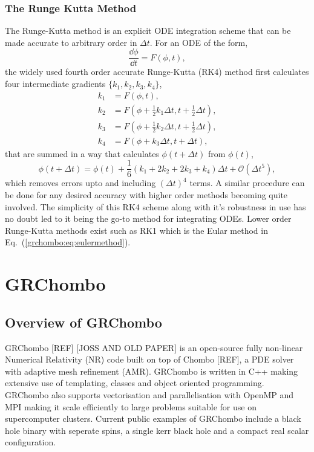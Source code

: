 \subsubsection{The Runge Kutta Method} \label{grchombo:sec:rk4}
The Runge-Kutta method is an explicit ODE integration scheme that can be made accurate to arbitrary order in $\Delta t$. For an ODE of the form,
\begin{equation}
\frac{\dd \phi}{ \dd t} = F(\phi,t),
\end{equation}
the widely used fourth order accurate Runge-Kutta (RK4) method first calculates four intermediate gradients $\{k_1,k_2,k_3,k_4\}$,
\begin{align}
k_1 &=  F(\phi,t) ,\\
k_2 &=  F(\phi + \frac{1}{2}k_1 \Delta t,t+ \frac{1}{2} \Delta t) ,\\
k_3 &=  F(\phi + \frac{1}{2}k_2 \Delta t,t+ \frac{1}{2} \Delta t) ,\\
k_4 &=  F(\phi + k_3 \Delta t,t+  \Delta t) ,
\end{align}
that are summed in a way that calculates $\phi(t+\Delta t)$ from $\phi(t)$,
\begin{equation}
\phi(t+\Delta t) = \phi(t) + \frac{1}{6}\left( k_1 + 2k_2 + 2k_3 + k_4\right)\Delta t + \mathcal{O}(\Delta t^5),
\end{equation}
which removes errors upto and including $(\Delta t)^4$ terms. A similar procedure can be done for any desired accuracy with higher order methods becoming quite involved. The simplicity of this RK4 scheme along with it's robustness in use has no doubt led to it being the go-to method for integrating ODEs. Lower order Runge-Kutta methods exist such as RK1 which is the Eular method in Eq.~(\ref{grchombo:eq:eulermethod}).



\section{GRChombo}
\subsection{Overview of GRChombo}

GRChombo [REF] [JOSS AND OLD PAPER] is an open-source fully non-linear Numerical Relativity (NR) code built on top of Chombo [REF], a PDE solver with adaptive mesh refinement (AMR). GRChombo is written in C++ making extensive use of templating, classes and object oriented programming. GRChombo also supports vectorisation and parallelisation with OpenMP and MPI making it scale efficiently to large problems suitable for use on supercomputer clusters. Current public examples of GRChombo include a black hole binary with seperate spins, a single kerr black hole and a compact real scalar configuration. 

